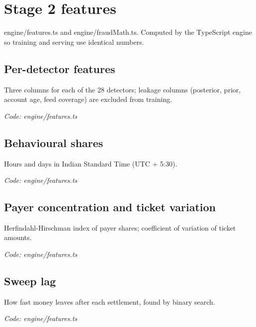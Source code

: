 \documentclass[11pt,a4paper]{article}
\newcommand{\where}[1]{\par{\small\itshape\color{mute}Code: #1}\par}
\begin{document}
\clearpage
\section{Stage 2 features}
{\color{mute}engine/features.ts and engine/fraudMath.ts. Computed by the TypeScript engine so training and serving use identical numbers.}

\subsection*{Per-detector features}
\par\smallskip\noindent{}\par\smallskip
Three columns for each of the 28 detectors; leakage columns (posterior, prior, account age, feed coverage) are excluded from training.
\where{engine/features.ts}

\subsection*{Behavioural shares}
\par\smallskip\noindent{}\par\smallskip
Hours and days in Indian Standard Time (UTC + 5:30).
\where{engine/features.ts}

\subsection*{Payer concentration and ticket variation}
\par\smallskip\noindent{}\par\smallskip
Herfindahl-Hirschman index of payer shares; coefficient of variation of ticket amounts.
\where{engine/features.ts}

\subsection*{Sweep lag}
\par\smallskip\noindent{}\par\smallskip
How fast money leaves after each settlement, found by binary search.
\where{engine/features.ts}
\end{document}
